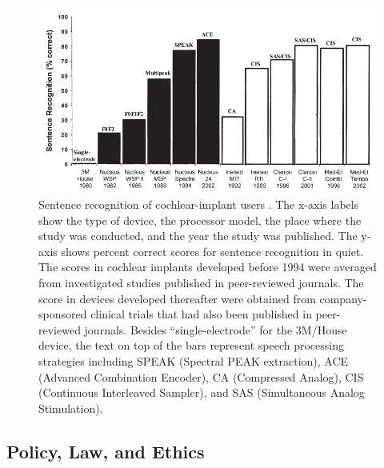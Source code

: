 \documentclass[letter,11pt]{article}
\begin{document}
\begin{figure}[hbtp]
\centering
\includegraphics[width=5in]{neuro2.png}

\caption{\justify Sentence recognition of cochlear-implant users \cite{Zeng2004}. The
x-axis labels show the type of device, the processor model, the place where the
study was conducted, and the year the study was published. The y-axis shows
percent correct scores for sentence recognition in quiet. The scores in
cochlear implants developed before 1994 were averaged from investigated studies
published in peer-reviewed journals. The score in devices developed thereafter
were obtained from company-sponsored clinical trials that had also been
published in peer-reviewed journals. Besides ``single-electrode'' for the
3M/House device, the text on top of the bars represent speech processing
strategies including SPEAK (Spectral PEAK extraction), ACE (Advanced
Combination Encoder), CA (Compressed Analog), CIS (Continuous Interleaved
Sampler), and SAS (Simultaneous Analog Stimulation).}
\label{neuro2}
\end{figure}
 

\subsection{Policy, Law, and Ethics}
\end{document}
